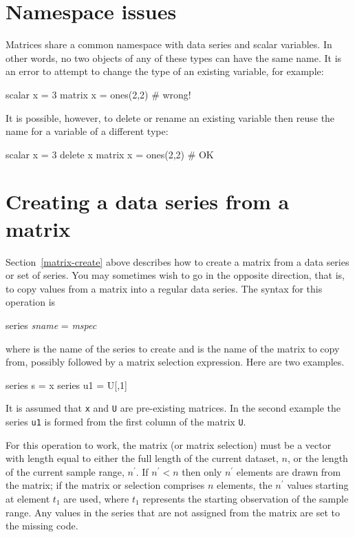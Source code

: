 \section{Namespace issues}
\label{matrix-namespace}

Matrices share a common namespace with data series and scalar
variables.  In other words, no two objects of any of these types can
have the same name.  It is an error to attempt to change the type of
an existing variable, for example:
%
\begin{code}
scalar x = 3
matrix x = ones(2,2) # wrong!
\end{code}
%
It is possible, however, to delete or rename an existing variable then
reuse the name for a variable of a different type:
\begin{code}
scalar x = 3
delete x
matrix x = ones(2,2) # OK
\end{code}


\section{Creating a data series from a matrix}
\label{matrix-create-series}

Section~\ref{matrix-create} above describes how to create a matrix
from a data series or set of series.  You may sometimes wish to go in
the opposite direction, that is, to copy values from a matrix 
into a regular data series.  The syntax for this operation is
%
\begin{textcode}
series \textsl{sname} = \textsl{mspec}
\end{textcode}
%
where  is the name of the series to create and
 is the name of the matrix to copy from, possibly followed
by a matrix selection expression.  Here are two examples.
%
\begin{code}
series s = x
series u1 = U[,1]
\end{code}
%
It is assumed that \texttt{x} and \texttt{U} are pre-existing
matrices.  In the second example the series \texttt{u1} is formed from
the first column of the matrix \texttt{U}.

For this operation to work, the matrix (or matrix selection) must be a
vector with length equal to either the full length of the current
dataset, $n$, or the length of the current sample range, $n^{\prime}$.
If $n^{\prime} < n$ then only $n^{\prime}$ elements are drawn from the
matrix; if the matrix or selection comprises $n$ elements, the
$n^{\prime}$ values starting at element $t_1$ are used, where $t_1$
represents the starting observation of the sample range.  Any values
in the series that are not assigned from the matrix are set to the
missing code.


